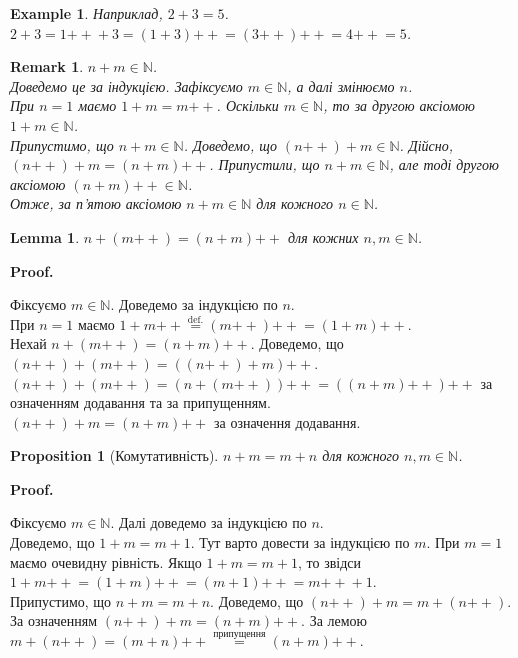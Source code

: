 \documentclass[a4paper, 14pt]{extarticle}
\makeatletter
\theoremstyle{theoremdd}
\theoremstyle{theoremdd}
\theoremstyle{theoremdd}
\theoremstyle{theoremdd}
\theoremstyle{theoremdd}
\theoremstyle{theoremdd}
\newtheorem{example}[theorem]{Example}
\theoremstyle{theoremdd}
\theoremstyle{theoremdd}
\theoremstyle{theoremdd}
\theoremstyle{theoremdd}
\newtheorem{proposition}[theorem]{Proposition}
\theoremstyle{theoremdd}
\theoremstyle{theoremdd}
\newtheorem{remark}[theorem]{Remark}
\theoremstyle{theoremdd}
\theoremstyle{theoremdd}
\newtheorem{lemma}[theorem]{Lemma}
\theoremstyle{theoremdd}
\theoremstyle{theoremdd}
\renewenvironment{proof}[1][Proof.\\]{\par
\pushQED{\hfill \qed}%
\normalfont \topsep6\p@\@plus6\p@\relax
\trivlist
\item\relax
{\bfseries
#1\@addpunct{.}}\hspace\labelsep\ignorespaces
}{%
\popQED\endtrivlist\@endpefalse
}
\newcommand{\plusplus}{\!\!\mathrel{++}}
\makeatother
\begin{document}
\begin{example}
Наприклад, $2 + 3 = 5$.\\
$2+3 = 1\plusplus + 3 = (1+3)\plusplus = (3 \plusplus) \plusplus = 4 \plusplus = 5$.
\end{example}

\begin{remark}
$n+m \in \mathbb{N}$.\\
Доведемо це за індукцією. Зафіксуємо $m \in \mathbb{N}$, а далі змінюємо $n$.\\
При $n = 1$ маємо $1+m = m \plusplus$. Оскільки $m \in \mathbb{N}$, то за другою аксіомою $1+m \in \mathbb{N}$.\\
Припустимо, що $n+m \in \mathbb{N}$. Доведемо, що $(n\plusplus) + m \in \mathbb{N}$. Дійсно,\\
$(n\plusplus) + m = (n + m)\plusplus$. Припустили, що $n+m \in \mathbb{N}$, але тоді другою аксіомою $(n+m)\plusplus \in \mathbb{N}$.\\
Отже, за п'ятою аксіомою $n+m \in \mathbb{N}$ для кожного $n \in \mathbb{N}$.
\end{remark}

\begin{lemma}
$n + (m\plusplus) = (n+m)\plusplus$ для кожних $n,m \in \mathbb{N}$.
\end{lemma}

\begin{proof}
Фіксуємо $m \in \mathbb{N}$. Доведемо за індукцією по $n$.\\
При $n = 1$ маємо $1 + m\plusplus \overset{\text{def.}}{=} (m\plusplus)\plusplus = (1+m)\plusplus$.\\
Нехай $n + (m\plusplus) = (n+m)\plusplus$. Доведемо, що \\ $(n\plusplus) + (m\plusplus) = ((n\plusplus) + m)\plusplus$.\\
$(n\plusplus) + (m\plusplus) = (n + (m\plusplus))\plusplus = ((n+m)\plusplus)\plusplus$ за означенням додавання та за припущенням.\\
$(n\plusplus) + m = (n+m)\plusplus$ за означення додавання.
\end{proof}

\begin{proposition}[Комутативність]
$n + m = m + n$ для кожного $n,m \in \mathbb{N}$.
\end{proposition}

\begin{proof}
Фіксуємо $m \in \mathbb{N}$. Далі доведемо за індукцією по $n$.\\
Доведемо, що $1+m = m+1$. Тут варто довести за індукцією по $m$. При $m = 1$ маємо очевидну рівність. Якщо $1+m = m+1$, то звідси $1 + m\plusplus = (1+m)\plusplus = (m+1)\plusplus = m\plusplus + 1$.\\
Припустимо, що $n+m = m+n$. Доведемо, що $(n\plusplus) + m = m + (n\plusplus)$.\\
За означенням $(n\plusplus) + m = (n+m)\plusplus$. За лемою $m + (n\plusplus) = (m+n)\plusplus \overset{\text{припущення}}{=} (n+m)\plusplus$.
\end{proof}
\end{document}
